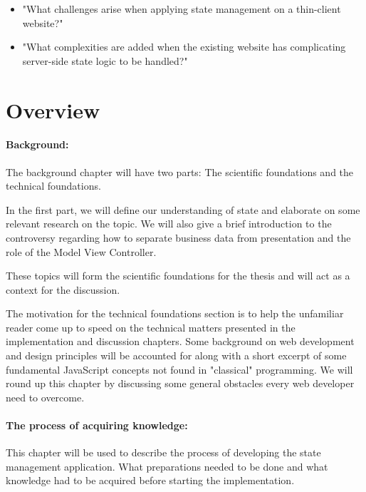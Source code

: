 \documentclass[english]{ifimaster}
\begin{document}
\begin{itemize}
\item[]"What challenges arise when applying state management on a thin-client website?"
\end{itemize}
\begin{itemize}
\item[]"What complexities are added when the existing website has complicating server-side state logic to be handled?"
\end{itemize}


\section{Overview}
\paragraph{Background:}
The background chapter will have two parts: The scientific foundations and the technical foundations.

In the first part, we will define our understanding of state and elaborate on some relevant research on the topic. We will also give a brief introduction to the controversy regarding how to separate business data from presentation and the role of the Model View Controller. 

These topics will form the scientific foundations for the thesis and will act as a context for the discussion.

The motivation for the technical foundations section is to help the unfamiliar reader come up to speed on the technical matters presented in the implementation and discussion chapters. Some background on web development and design principles will be accounted for along with a short excerpt of some fundamental JavaScript concepts not found in "classical" programming. We will round up this chapter by discussing some general obstacles every web developer need to overcome. 

\paragraph{The process of acquiring knowledge:}
This chapter will be used to describe the process of developing the state management application. What preparations needed to be done and what knowledge had to be acquired before starting the implementation. 
\end{document}
